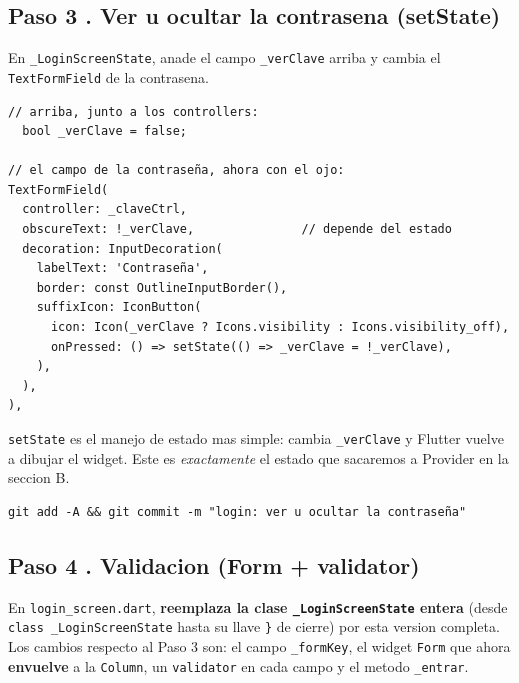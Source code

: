 \documentclass[11pt,a4paper,oneside]{book}
\newcommand{\file}[1]{\texttt{\textcolor{brandDark}{#1}}}
\begin{document}
\subsection*{Paso 3 . Ver u ocultar la contrasena (setState)}
\begin{wherebox}
En \texttt{\_LoginScreenState}, anade el campo \texttt{\_verClave} arriba y cambia el
\texttt{TextFormField} de la contrasena.
\end{wherebox}

\begin{lstlisting}
// arriba, junto a los controllers:
  bool _verClave = false;

// el campo de la contraseña, ahora con el ojo:
TextFormField(
  controller: _claveCtrl,
  obscureText: !_verClave,               // depende del estado
  decoration: InputDecoration(
    labelText: 'Contraseña',
    border: const OutlineInputBorder(),
    suffixIcon: IconButton(
      icon: Icon(_verClave ? Icons.visibility : Icons.visibility_off),
      onPressed: () => setState(() => _verClave = !_verClave),
    ),
  ),
),
\end{lstlisting}

\begin{whatbox}
\texttt{setState} es el manejo de estado mas simple: cambia \texttt{\_verClave} y
Flutter vuelve a dibujar el widget. Este es \emph{exactamente} el estado que
sacaremos a Provider en la seccion B.
\end{whatbox}

\begin{lstlisting}[language={},numbers=none]
git add -A && git commit -m "login: ver u ocultar la contraseña"
\end{lstlisting}

\subsection*{Paso 4 . Validacion (Form + validator)}
\begin{wherebox}
En \file{login\_screen.dart}, \textbf{reemplaza la clase \texttt{\_LoginScreenState}
entera} (desde \texttt{class \_LoginScreenState} hasta su llave \texttt{\}} de cierre)
por esta version completa. Los cambios respecto al Paso 3 son: el campo
\texttt{\_formKey}, el widget \texttt{Form} que ahora \textbf{envuelve} a la
\texttt{Column}, un \texttt{validator} en cada campo y el metodo \texttt{\_entrar}.
\end{wherebox}
\end{document}

